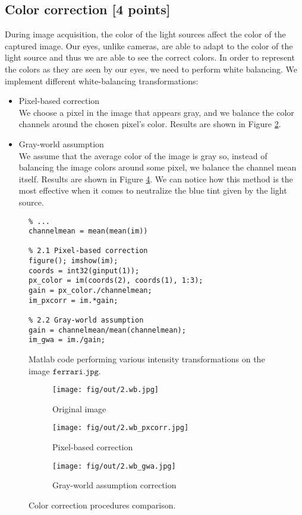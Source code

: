 \documentclass[tikz,14pt,fleqn]{article}
\begin{document}
\subsection{Color correction [4 points]}
During image acquisition, the color of the light sources affect the color of the captured image. Our eyes, unlike cameras, are able to adapt to the color of the light source and thus we are able to see the correct colors. In order to represent the colors as they are seen by our eyes, we need to perform white balancing. We implement different white-balancing transformations:
\begin{itemize}
    \item Pixel-based correction\\
    We choose a pixel in the image that appears gray, and we balance the color channels around the chosen pixel's color. Results are shown in Figure \ref{fig:2.wb_pxcorr}.
    \item Gray-world assumption\\
    We assume that the average color of the image is gray so, instead of balancing the image colors around some pixel, we balance the channel mean itself. Results are shown in Figure \ref{fig:2.wb_gwa}. We can notice how this method is the most effective when it comes to neutralize the blue tint given by the light source.
\end{itemize}
\begin{figure}[h!]
    \begin{verbatim} 
% ...
channelmean = mean(mean(im))

% 2.1 Pixel-based correction
figure(); imshow(im);
coords = int32(ginput(1));
px_color = im(coords(2), coords(1), 1:3);
gain = px_color./channelmean;
im_pxcorr = im.*gain;

% 2.2 Gray-world assumption
gain = channelmean/mean(channelmean);
im_gwa = im./gain;
        \end{verbatim}
\caption{Matlab code performing various intensity transformations on the image $\texttt{ferrari.jpg}$.}
\end{figure}
\begin{figure}[h!]
    \begin{center}
    \begin{subfigure}{0.31\linewidth}
        \centering
        \texttt{[image: fig/out/2.wb.jpg]}
        \caption{Original image}
        \label{fig:2.wb}
    \end{subfigure}
    \begin{subfigure}{0.31\linewidth}
        \centering
        \texttt{[image: fig/out/2.wb\_pxcorr.jpg]}
        \caption{Pixel-based correction}
        \label{fig:2.wb_pxcorr}
    \end{subfigure}
    \begin{subfigure}{0.31\linewidth}
        \centering
        \texttt{[image: fig/out/2.wb\_gwa.jpg]}
        \caption{Gray-world assumption correction}
        \label{fig:2.wb_gwa}
    \end{subfigure}
    \caption{Color correction procedures comparison.}
\end{center}
\end{figure}
\end{document}
